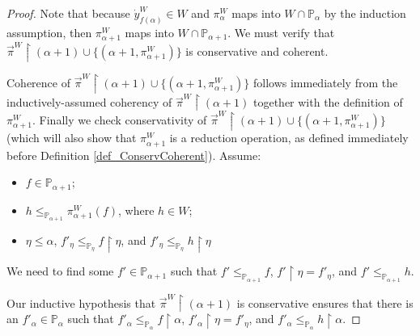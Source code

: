\documentclass{amsart}
\begin{document}
\begin{proof}
Note that because $\dot{y}^W_{f(\alpha)} \in W$ and $\pi^W_\alpha$ maps into $W \cap \mathbb{P}_\alpha$ by the induction assumption, then $\pi^W_{\alpha+1}$ maps into $W \cap \mathbb{P}_{\alpha+1}$.  We must verify that $\vec{\pi}^W \restriction (\alpha+1) \cup \{ (\alpha+1, \pi^W_{\alpha+1} )\} $ is conservative and coherent.  



Coherence of $\vec{\pi}^W \restriction (\alpha+1) \cup \{ (\alpha+1, \pi^W_{\alpha+1}) \} $ follows immediately from the inductively-assumed coherency of $\vec{\pi}^W \restriction (\alpha+1)$ together with the definition of $\pi^W_{\alpha+1}$.  Finally we check conservativity of $\vec{\pi}^W \restriction (\alpha+1) \cup \{ (\alpha+1, \pi^W_{\alpha+1} )\} $ (which will also show that $\pi^W_{\alpha+1}$ is a reduction operation, as defined immediately before Definition \ref{def_ConservCoherent}).  Assume:
\begin{itemize}
 \item $f \in \mathbb{P}_{\alpha+1}$;
 \item $h \le_{\mathbb{P}_{\alpha+1}} \pi^W_{\alpha+1}(f)$, where $h \in W$;
 \item $\eta \le \alpha$, $f'_\eta \le_{\mathbb{P}_\eta} f \restriction \eta$, and $f'_\eta \le_{\mathbb{P}_\eta} h \restriction \eta$
\end{itemize}
We need to find some $f' \in \mathbb{P}_{\alpha+1}$ such that $f' \le_{\mathbb{P}_{\alpha+1}} f$, $f' \restriction \eta = f'_\eta$, and $f' \le_{\mathbb{P}_{\alpha+1}} h$.  

Our inductive hypothesis that $\vec{\pi}^W \restriction (\alpha+1)$ is conservative ensures that there is an $f'_\alpha \in \mathbb{P}_\alpha$ such that $f'_\alpha \le_{\mathbb{P}_\alpha} f \restriction \alpha$, $f'_\alpha \restriction \eta = f'_\eta$, and $f'_\alpha \le_{\mathbb{P}_\alpha} h \restriction \alpha$. 


\end{proof}
\end{document}

